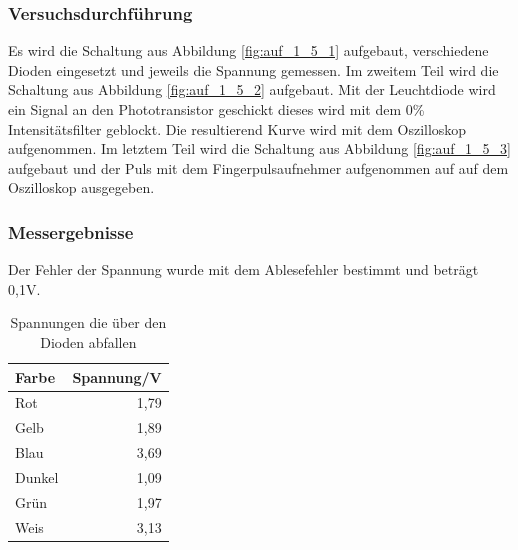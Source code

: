 \documentclass[12pt,a4paper]{article}
\begin{document}
\subsubsection*{Versuchsdurchführung}

Es wird die Schaltung aus Abbildung \ref{fig:auf_1_5_1} aufgebaut, verschiedene Dioden eingesetzt und jeweils die Spannung gemessen. Im zweitem Teil wird die Schaltung aus Abbildung \ref{fig:auf_1_5_2} aufgebaut. Mit der Leuchtdiode wird ein Signal an den Phototransistor geschickt dieses wird mit dem 0\% Intensitätsfilter  geblockt. Die resultierend Kurve wird mit dem Oszilloskop aufgenommen. Im letztem Teil wird die Schaltung aus Abbildung \ref{fig:auf_1_5_3} aufgebaut und der Puls mit dem Fingerpulsaufnehmer aufgenommen auf auf dem Oszilloskop ausgegeben.

\subsubsection*{Messergebnisse}

Der Fehler der Spannung wurde mit dem Ablesefehler bestimmt und beträgt 0,1V.

\begin{table}[H]
\begin{center}
\begin{tabular}{|l|r|}
\hline
Farbe & \multicolumn{1}{l|}{Spannung/V} \\ \hline
Rot & 1,79 \\ \hline
Gelb & 1,89 \\ \hline
Blau & 3,69 \\ \hline
Dunkel & 1,09 \\ \hline
Grün & 1,97 \\ \hline
Weis & 3,13 \\ \hline
\end{tabular}
\end{center}
\caption{Spannungen die über den Dioden abfallen}
\label{tab:1_5}
\end{table}
\end{document}
